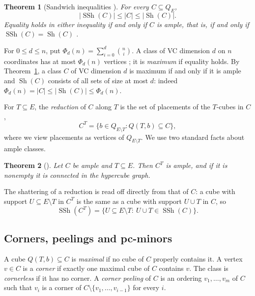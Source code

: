 \documentclass[11pt]{article}
\numberwithin{equation}{section}
\newtheorem{theorem}{Theorem}[section]
\theoremstyle{definition}
\theoremstyle{remark}
\newcommand{\Sh}{\operatorname{Sh}}
\newcommand{\SSh}{\operatorname{SSh}}
\begin{document}
\begin{theorem}[Sandwich inequalities {\cite{Bollobas95,Anstee2002,BandeltCDK06}}]
\label{thm:sandwich}
For every \(C\subseteq Q_E\),
\[
 |\SSh(C)|\le|C|\le|\Sh(C)|.
\]
Equality holds in either inequality if and only if \(C\) is ample,
that is, if and only if \(\SSh(C)=\Sh(C)\)
\cite[Corollary~1 and Theorem~2]{BandeltCDK06}.
\end{theorem}

For \(0\le d\le n\), put \(\Phi_d(n)=\sum_{i=0}^d\binom ni\).  A class of VC
dimension \(d\) on \(n\) coordinates has at most \(\Phi_d(n)\) vertices
\cite{Sauer1972Density}; it is \emph{maximum} if equality holds.  By
Theorem~\ref{thm:sandwich}, a class \(C\) of VC dimension \(d\) is maximum
if and only if it is ample and \(\Sh(C)\) consists of all sets of size at
most \(d\): indeed \(\Phi_d(n)=|C|\le|\Sh(C)|\le\Phi_d(n)\).

For \(T\subseteq E\), the \emph{reduction} of \(C\) along \(T\) is the set
of placements of the \(T\)-cubes in \(C\),
\[
 C^T=\{b\in Q_{E\setminus T}: Q(T,b)\subseteq C\},
\]
where we view placements as vertices of \(Q_{E\setminus T}\).  We use two
standard facts about ample classes.

\begin{theorem}[{\cite[Theorems~3.1 and~3.2]{ChalopiChepoiMoran22}}]
\label{thm:reductions}
Let \(C\) be ample and \(T\subseteq E\).  Then \(C^T\) is ample, and if it
is nonempty it is connected in the hypercube graph.
\end{theorem}

The shattering of a reduction is read off directly from that of \(C\): a
cube with support \(U\subseteq E\setminus T\) in \(C^T\) is the same as a
cube with support \(U\cup T\) in \(C\), so
\begin{equation}
 \SSh(C^T)=\{U\subseteq E\setminus T:\ U\cup T\in\SSh(C)\}.
 \label{eq:ssh-reduction}
\end{equation}

\subsection{Corners, peelings and pc-minors}

A cube \(Q(T,b)\subseteq C\) is \emph{maximal} if no cube of \(C\)
properly contains it.  A vertex \(v\in C\) is a \emph{corner} if exactly one
maximal cube of \(C\) contains \(v\).  The class is \emph{cornerless} if it
has no corner.  A \emph{corner peeling} of \(C\) is an ordering
\(v_1,\dots,v_m\) of \(C\) such that \(v_i\) is a corner of
\(C\setminus\{v_1,\dots,v_{i-1}\}\) for every \(i\).
\end{document}
